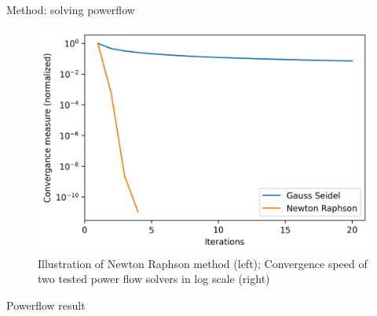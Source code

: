 \documentclass[final]{beamer}
\newlength{\colwidth}
\begin{document}
\begin{frame}[t]
\begin{columns}[t]
\begin{column}{\colwidth}
\begin{block}{Method: solving powerflow}
      \begin{figure}
        
        \includegraphics[width=18cm]{./img/graphs/convergance.png}

        \caption{Illustration of Newton Raphson method (left); Convergence speed of two tested power flow solvers in log scale (right)}
      \end{figure} 
        
  
  
  
  
  
  

 \end{block}

 \begin{block}{Powerflow result}


\end{block}
\end{column}
\end{columns}
\end{frame}
\end{document}
